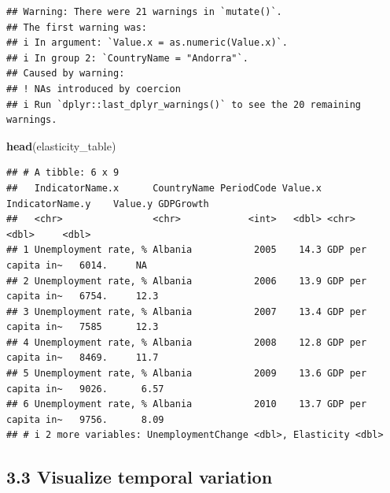 \documentclass[
]{article}
\newenvironment{Shaded}{\begin{snugshade}}{\end{snugshade}}
\newcommand{\FunctionTok}[1]{\textcolor[rgb]{0.13,0.29,0.53}{\textbf{#1}}}
\newcommand{\NormalTok}[1]{#1}
\begin{document}
\begin{verbatim}
## Warning: There were 21 warnings in `mutate()`.
## The first warning was:
## i In argument: `Value.x = as.numeric(Value.x)`.
## i In group 2: `CountryName = "Andorra"`.
## Caused by warning:
## ! NAs introduced by coercion
## i Run `dplyr::last_dplyr_warnings()` to see the 20 remaining warnings.
\end{verbatim}

\begin{Shaded}
\begin{Highlighting}[]
\FunctionTok{head}\NormalTok{(elasticity\_table)}
\end{Highlighting}
\end{Shaded}

\begin{verbatim}
## # A tibble: 6 x 9
##   IndicatorName.x      CountryName PeriodCode Value.x IndicatorName.y    Value.y GDPGrowth
##   <chr>                <chr>            <int>   <dbl> <chr>                <dbl>     <dbl>
## 1 Unemployment rate, % Albania           2005    14.3 GDP per capita in~   6014.     NA   
## 2 Unemployment rate, % Albania           2006    13.9 GDP per capita in~   6754.     12.3 
## 3 Unemployment rate, % Albania           2007    13.4 GDP per capita in~   7585      12.3 
## 4 Unemployment rate, % Albania           2008    12.8 GDP per capita in~   8469.     11.7 
## 5 Unemployment rate, % Albania           2009    13.6 GDP per capita in~   9026.      6.57
## 6 Unemployment rate, % Albania           2010    13.7 GDP per capita in~   9756.      8.09
## # i 2 more variables: UnemploymentChange <dbl>, Elasticity <dbl>
\end{verbatim}

\subsection{3.3 Visualize temporal
variation}\label{visualize-temporal-variation}
\end{document}
